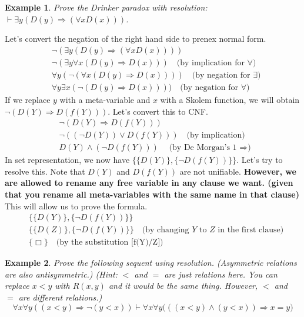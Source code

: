 \documentclass[10pt]{article}
\newtheorem{problem}{Example}
\newenvironment{solution}[1][\emph{Solution:}]{\begin{trivlist}
\item[\hskip \labelsep {\bfseries #1}]}{\end{trivlist}}
\newcommand{\imp}{\ensuremath{\Rightarrow}}
\newcommand{\set}[1]{\{#1\}}
\begin{document}
\begin{problem}
Prove the Drinker paradox with resolution: $\vdash \exists y (D(y) \imp (\forall x D(x)))$.
\end{problem}
\begin{solution}
Let's convert the negation of the right hand side to prenex normal form.
\begin{align*}
& \lnot (\exists y (D(y) \imp (\forall x D(x))))\\
& \lnot (\exists y \forall x (D(y) \imp D(x)))  \quad\text{(by implication for $\forall$)}\\
& \forall y (\lnot (\forall x (D(y) \imp D(x))))  \quad\text{(by negation for $\exists$)}\\
& \forall y \exists x ( \lnot (D(y) \imp D(x))))  \quad\text{(by negation for $\forall$)}
\end{align*}
If we replace $y$ with a meta-variable and $x$ with a Skolem function, we will obtain $\lnot (D(Y) \imp D(f(Y)))$. Let's convert this to CNF.
\begin{align*}
& \lnot (D(Y) \imp D(f(Y)))\\
& \lnot ((\lnot D(Y)) \lor D(f(Y))) \quad\text{(by implication)}\\
& D(Y) \land (\lnot D(f(Y))) \quad\text{(by De Morgan's 1 $\imp$)}
\end{align*}
In set representation, we now have $\set{\set{D(Y)}, \set{\lnot D(f(Y))}}$. Let's try to resolve this. Note that $D(Y)$ and $D(f(Y))$ are not unifiable. \textbf{However, we are allowed to rename any free variable in any clause we want. (given that you rename all meta-variables with the same name in that clause)} This will allow us to prove the formula.
\begin{align*}
& \set{\set{D(Y)}, \set{\lnot D(f(Y))}}\\
& \set{\set{D(Z)}, \set{\lnot D(f(Y))}} \quad\text{(by changing $Y$ to $Z$ in the first clause)}\\
& \set{\Box} \quad\text{(by the substitution [f(Y)/Z])}
\end{align*}
\end{solution}

\begin{problem}
Prove the following sequent using resolution. (Asymmetric relations are also antisymmetric.) (Hint: $<$ and $=$ are just relations here. You can replace $x<y$ with $R(x,y)$ and it would be the same thing. However, $<$ and $=$ are different relations.)
$$\forall x \forall y ((x < y) \imp \lnot (y < x)) \vdash \forall x \forall y \big(((x<y) \land (y < x)) \imp x = y\big)$$
\end{problem}
\end{document}
